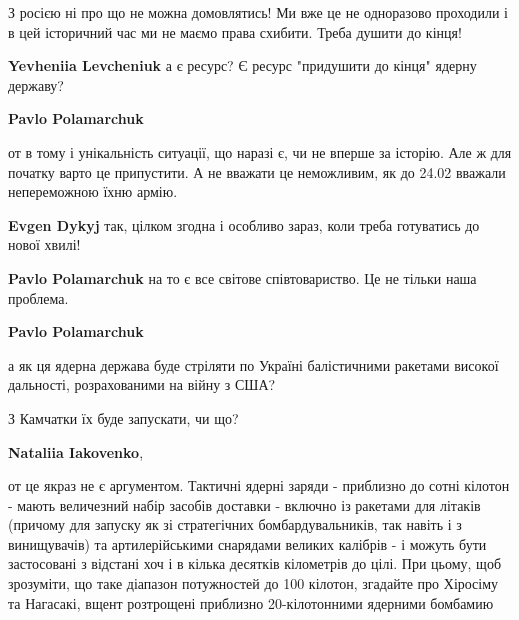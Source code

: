 
 
 
 
 
\zzSecCmt

\begin{itemize} %

З росією ні про що не можна домовлятись! Ми вже це не одноразово проходили і в
цей історичний час ми не маємо права схибити. Треба душити до кінця!

\begin{itemize} %
\textbf{Yevheniia Levcheniuk} а є ресурс? Є ресурс "придушити до кінця" ядерну державу?

\textbf{Pavlo Polamarchuk} 

от в тому і унікальність ситуації, що наразі є, чи не вперше за історію. Але ж
для початку варто це припустити. А не вважати це неможливим, як до 24.02
вважали непереможною їхню армію.

\textbf{Evgen Dykyj} так, цілком згодна і особливо зараз, коли треба готуватись до нової хвилі!

\textbf{Pavlo Polamarchuk} на то є все світове співтовариство. Це не тільки наша проблема.

\textbf{Pavlo Polamarchuk} 

а як ця ядерна держава буде стріляти по Україні балістичними ракетами високої
дальності, розрахованими на війну з США?

З Камчатки їх буде запускати, чи що?

\textbf{Nataliia Iakovenko}, 

от це якраз не є аргументом. Тактичні ядерні заряди - приблизно до сотні
кілотон - мають величезний набір засобів доставки - включно із ракетами для
літаків (причому для запуску як зі стратегічних бомбардувальників, так навіть і
з винищувачів) та артилерійськими снарядами великих калібрів - і можуть бути
застосовані з відстані хоч і в кілька десятків кілометрів до цілі. При цьому,
щоб зрозуміти, що таке діапазон потужностей до 100 кілотон, згадайте про
Хіросіму та Нагасакі, вщент розтрощені приблизно 20-кілотонними ядерними
бомбамию


\end{itemize}
\end{itemize}
